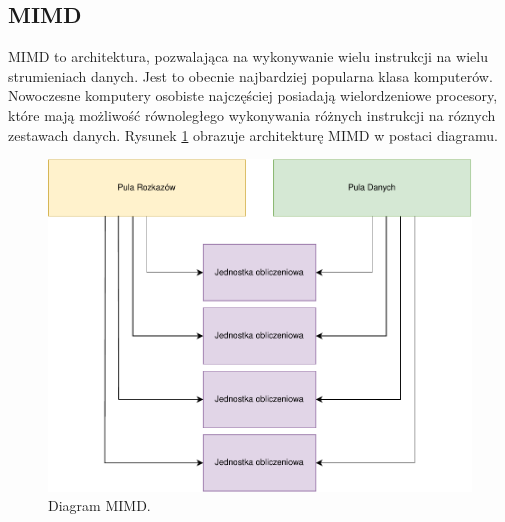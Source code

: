 \documentclass[a4paper,12pt]{book} %
\begin{document}
\subsection {MIMD}
MIMD to architektura, pozwalająca na wykonywanie wielu instrukcji na wielu strumieniach danych. Jest to obecnie najbardziej popularna klasa komputerów. Nowoczesne komputery osobiste najczęściej posiadają wielordzeniowe procesory, które mają możliwość równoległego wykonywania różnych instrukcji na róznych zestawach danych. Rysunek \ref{fig:mimd} obrazuje architekturę MIMD w postaci diagramu.
\begin{figure}
	\centering
	\includegraphics[scale=1]{assets/MIMD.pdf}
	\caption{Diagram MIMD.}
	\label{fig:mimd}
\end{figure}
\end{document}
